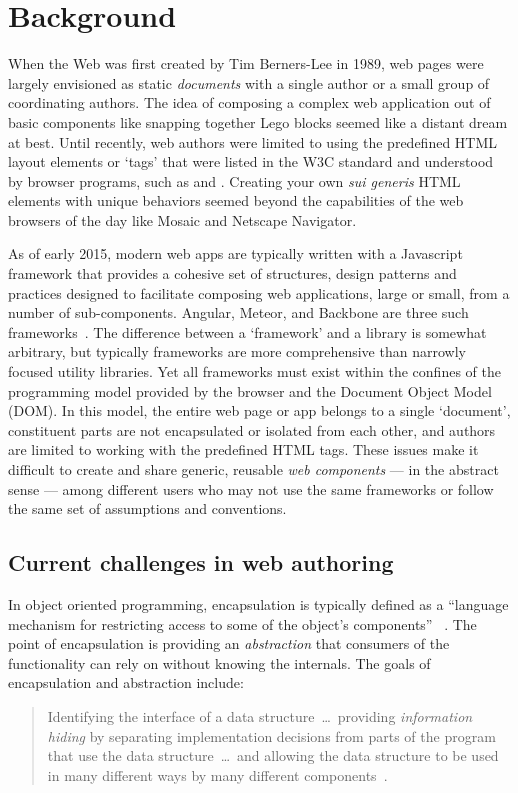 \chapter{Background}
%

When the Web was first created by Tim Berners-Lee in 1989, web pages were largely envisioned as static \textit{documents} with a single author or a small group of coordinating authors. 
The idea of composing a complex web application out of basic components like snapping together Lego blocks seemed like a distant dream at best.
Until recently, web authors were limited to using the predefined HTML layout elements or `tags' that were listed in the W3C standard and understood by browser programs, such as  and . 
Creating your own \textit{sui generis} HTML elements with unique behaviors seemed beyond the capabilities of the web browsers of the day like Mosaic and Netscape Navigator.

As of early 2015, modern web apps are typically written with a Javascript framework that provides a cohesive set of structures, design patterns and practices designed to facilitate composing web applications, large or small, from a number of sub-components.
Angular, Meteor, and Backbone are three such frameworks~\cite{dickey2014}.
The difference between a `framework' and a library is somewhat arbitrary, but typically frameworks are more comprehensive than narrowly focused utility libraries.
Yet all frameworks must exist within the confines of the programming model provided by the browser and the Document Object Model (DOM). 
In this model, the entire web page or app belongs to a single `document', constituent parts are not encapsulated or isolated from each other, and authors are limited to working with the predefined HTML tags.
These issues make it difficult to create and share generic, reusable \textit{web components} 
--- in the abstract sense --- 
among different users who may not use the same frameworks or follow the same set of assumptions and conventions.

\section{Current challenges in web authoring}
In object oriented programming, encapsulation is typically defined as a 
``language mechanism for restricting access to some of the object's components''
~\cite[p. 522]{mitchell2003}.
The point of encapsulation is providing an \textit{abstraction} that consumers of the functionality can rely on without knowing the internals. 
The goals of encapsulation and abstraction include:
\begin{quote}
Identifying the interface of a data structure~\dots~providing \textit{information hiding} by separating implementation decisions from parts of the program that use the data 
structure~\dots~and allowing the data structure to be used in many different ways by many different components~\cite[p. 243]{mitchell2003}.
\end{quote}

